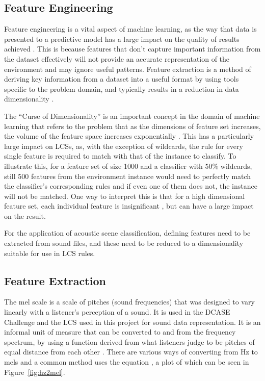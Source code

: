 \documentclass[11pt]{article}
\begin{document}
\subsection{Feature Engineering}
\label{sec:featEng}

Feature engineering is a vital aspect of machine learning, as the way that data is presented to a predictive model has a large impact on the quality of results achieved \cite{Brownlee2014}. This is because features that don't capture important information from the dataset effectively will not provide an accurate representation of the environment and may ignore useful patterns. Feature extraction is a method of deriving key information from a dataset into a useful format by using tools specific to the problem domain, and typically results in a reduction in data dimensionality \cite{Howbert2012}.

The ``Curse of Dimensionality'' is an important concept in the domain of machine learning that refers to the problem that as the dimensions of feature set increases, the volume of the feature space increases exponentially \cite{Keogh2010}. This has a particularly large impact on LCSs, as, with the exception of wildcards, the rule for every single feature is required to match with that of the instance to classify. To illustrate this, for a feature set of size 1000 and a classifier with 50\% wildcards, still 500 features from the environment instance would need to perfectly match the classifier's corresponding rules and if even one of them does not, the instance will not be matched. One way to interpret this is that for a high dimensional feature set, each individual feature is insignificant \cite{Keogh2010}, but can have a large impact on the result.

For the application of acoustic scene classification, defining features need to be extracted from sound files, and these need to be reduced to a dimensionality suitable for use in LCS rules.

\subsection{Feature Extraction}
\label{sec:featExt}

The mel scale is a scale of pitches (sound frequencies) that was designed to vary linearly with a listener's perception of a sound. It is used in the DCASE Challenge and the LCS used in this project for sound data representation. It is an informal unit of measure that can be converted to and from the frequency spectrum, by using a function derived from what listeners judge to be pitches of equal distance from each other \cite{Luening1975}. There are various ways of converting from Hz to mels and a common method uses the equation  \cite{OShaughnessy1987}, a plot of which can be seen in Figure~\ref{fig:hz2mel}.
\end{document}
